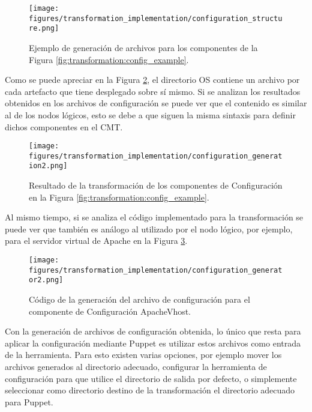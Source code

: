 \begin{figure}[htbp]
    \centering
    \texttt{[image: figures/transformation\_implementation/configuration\_structure.png]}
    \caption{Ejemplo de generación de archivos para los componentes de la Figura \ref{fig:transformation:config_example}.}
    \label{fig:transformation:config_generation}
\end{figure}

Como se puede apreciar en la Figura \ref{fig:transformation:configuration_generated_2}, el directorio OS contiene un archivo por cada artefacto que tiene desplegado sobre sí mismo. Si se analizan los resultados obtenidos en los archivos de configuración se puede ver que el contenido es similar al de los nodos lógicos, esto se debe a que siguen la misma sintaxis para definir dichos componentes en el CMT.

\begin{figure}[htbp]
    \centering
    \texttt{[image: figures/transformation\_implementation/configuration\_generation2.png]}
    \caption{Resultado de la transformación de los componentes de Configuración en la Figura \ref{fig:transformation:config_example}.}
    \label{fig:transformation:configuration_generated_2}
\end{figure}

Al mismo tiempo, si se analiza el código implementado para la transformación se puede ver que también es análogo al utilizado por el nodo lógico, por ejemplo, para el servidor virtual de Apache en la Figura \ref{fig:transformation:configuration_generator_2}.

\begin{figure}[H]
    \centering
    \texttt{[image: figures/transformation\_implementation/configuration\_generator2.png]}
    \caption{Código de la generación del archivo de configuración para el componente de Configuración ApacheVhost.}
    \label{fig:transformation:configuration_generator_2}
\end{figure}

Con la generación de archivos de configuración obtenida, lo único que resta para aplicar la configuración mediante Puppet es utilizar estos archivos como entrada de la herramienta. Para esto existen varias opciones, por ejemplo mover los archivos generados al directorio adecuado, configurar la herramienta de configuración para que utilice el directorio de salida por defecto, o simplemente seleccionar como directorio destino de la transformación el directorio adecuado para Puppet. 

